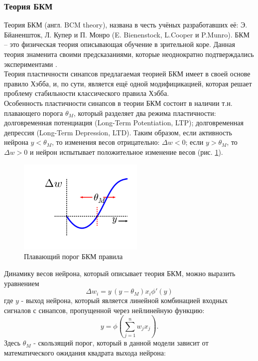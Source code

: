 \documentclass[a4paper,10pt]{article}
\begin{document}
\subsubsection{Теория БКМ}
\indent Теория БКМ (англ. BCM theory), названа в честь учёных разработавших её: Э. Бйаненшток, Л. Купер и П. Монро (E. Bienenstock, L.Cooper и P.Munro). БКМ -- это физическая теория описывающая обучение в зрительной коре. Данная теория знаменита своими предсказаниями, которые неоднократно подтверждались экспериментами \cite{Cooper}.\\
\indent Теория пластичности синапсов предлагаемая теорией БКМ имеет в своей основе правило Хэбба, и, по сути, является ещё одной модифицикацией, которая решает проблему стабильности классического правила Хэбба.\\
\indent Особенность пластичности синапсов в теории БКМ состоит в наличии т.н. плавающего порога $\theta_{M}$, который разделяет два режима пластичности: долговременная потенциация (Long-Term Potentiation, LTP); долговременная депрессия (Long-Term Depression, LTD). Таким образом, если активность нейрона $y<\theta_{M}$, то изменения весов отрицательно: $\Delta w<0$; если $y>\theta_{M}$, то $\Delta w>0$ и нейрон испытывает положительное изменение весов (рис. \ref{bcm_pic}).
\begin{figure}[ht]
\centering
\captionsetup{justification=centering,margin=1cm}
\includegraphics[width=60mm,scale=0.2]{bcm.png}
\caption{Плавающий порог БКМ правила}
\label{bcm_pic}
\end{figure}
\FloatBarrier
\indent Динамику весов нейрона, который описывает теория БКМ, можно выразить уравнением
\begin{equation}
\Delta w_{i} = y\,(y - \theta_{M})x_{i}\phi'(y)
\end{equation}
где $y$ - выход нейрона, который является линейной комбинацией входных сигналов с синапсов, пропущенной через нейлинейную функцию:
\begin{equation}
y = \phi(\sum_{j=1}^{n}w_{j}x_{j}).
\end{equation}
Здесь $\theta_{M}$ - скользящий порог, который в данной модели зависит от математического ожидания квадрата выхода нейрона:
\end{document}
